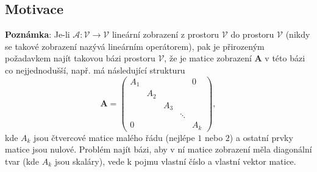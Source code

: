     \subsection{Motivace} 
      \textbf{Poznámka}: Je-li \(\mathcal{A} : \mathcal{V} \rightarrow \mathcal{V}\) lineární 
      zobrazení z prostoru \(\mathcal{V}\) do prostoru \(\mathcal{V}\) (nikdy se takové zobrazení 
      nazývá lineárním operátorem), pak je přirozeným požadavkem najít takovou bázi prostoru 
      \(\mathcal{V}\), že je matice zobrazení $\mathbf{A}$ v této bázi co nejjednodušší, např. má 
      následující strukturu
      \begin{equation*}
         \mathbf{A}=
           \left(\begin{array}{ccccc}
             \boxed{A_1}       &             &       &       & 0   \\
                 & \boxed{A_2} &             &       &             \\
                 &             & \boxed{A_3} &       &             \\
                 &             &             &\ddots &             \\
              0  &             &             &       & \boxed{A_k}
            \end{array}
           \right),
     \end{equation*}
     kde \(A_k\) jsou čtvercové matice malého řádu (nejlépe \(1\) nebo \(2\)) a ostatní prvky 
     matice jsou nulové. Problém najít bázi, aby v ní matice zobrazení měla diagonální tvar (kde 
     \(A_k\) jsou skaláry), vede k pojmu vlastní číslo a vlastní vektor matice.

